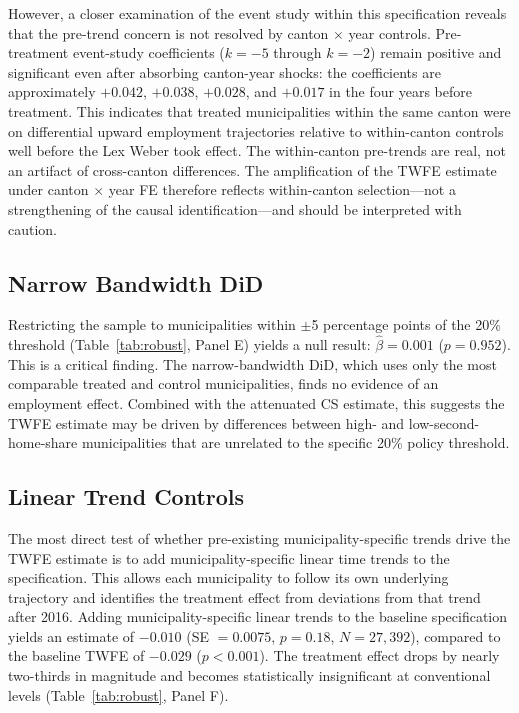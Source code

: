 \documentclass[12pt]{article}
\begin{document}
However, a closer examination of the event study within this specification reveals that the pre-trend concern is not resolved by canton $\times$ year controls. Pre-treatment event-study coefficients ($k = -5$ through $k = -2$) remain positive and significant even after absorbing canton-year shocks: the coefficients are approximately $+0.042$, $+0.038$, $+0.028$, and $+0.017$ in the four years before treatment. This indicates that treated municipalities within the same canton were on differential upward employment trajectories relative to within-canton controls well before the Lex Weber took effect. The within-canton pre-trends are real, not an artifact of cross-canton differences. The amplification of the TWFE estimate under canton $\times$ year FE therefore reflects within-canton selection---not a strengthening of the causal identification---and should be interpreted with caution.

\subsection{Narrow Bandwidth DiD}

Restricting the sample to municipalities within $\pm$5 percentage points of the 20\% threshold (Table~\ref{tab:robust}, Panel E) yields a null result: $\hat{\beta} = 0.001$ ($p = 0.952$). This is a critical finding. The narrow-bandwidth DiD, which uses only the most comparable treated and control municipalities, finds no evidence of an employment effect. Combined with the attenuated CS estimate, this suggests the TWFE estimate may be driven by differences between high- and low-second-home-share municipalities that are unrelated to the specific 20\% policy threshold.



\subsection{Linear Trend Controls}

The most direct test of whether pre-existing municipality-specific trends drive the TWFE estimate is to add municipality-specific linear time trends to the specification. This allows each municipality to follow its own underlying trajectory and identifies the treatment effect from deviations from that trend after 2016. Adding municipality-specific linear trends to the baseline specification yields an estimate of $-0.010$ (SE $= 0.0075$, $p = 0.18$, $N = 27{,}392$), compared to the baseline TWFE of $-0.029$ ($p < 0.001$). The treatment effect drops by nearly two-thirds in magnitude and becomes statistically insignificant at conventional levels (Table~\ref{tab:robust}, Panel F).
\end{document}
